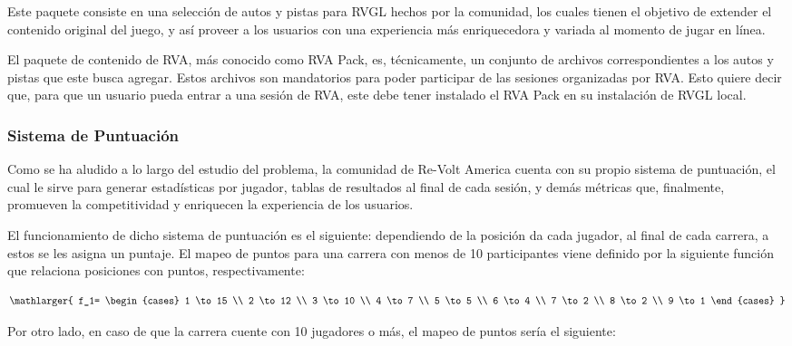 Este paquete consiste en una selección de autos y pistas para RVGL hechos por la comunidad, los cuales tienen el objetivo de extender el contenido original del juego, y así proveer a los usuarios con una experiencia más enriquecedora y variada al momento de jugar en línea.

El paquete de contenido de RVA, más conocido como RVA Pack, es, técnicamente, un conjunto de archivos correspondientes a los autos y pistas que este busca agregar. Estos archivos son mandatorios para poder participar de las sesiones organizadas por RVA. Esto quiere decir que, para que un usuario pueda entrar a una sesión de RVA, este debe tener instalado el RVA Pack en su instalación de RVGL local.

\subsubsection{Sistema de Puntuación}
Como se ha aludido a lo largo del estudio del problema, la comunidad de Re-Volt America cuenta con su propio sistema de puntuación, el cual le sirve para generar estadísticas por jugador, tablas de resultados al final de cada sesión, y demás métricas que, finalmente, promueven la competitividad y enriquecen la experiencia de los usuarios.

El funcionamiento de dicho sistema de puntuación es el siguiente: dependiendo de la posición da cada jugador, al final de cada carrera, a estos se les asigna un puntaje. El mapeo de puntos para una carrera con menos de 10 participantes viene definido por la siguiente función que relaciona posiciones con puntos, respectivamente:

\[
\mathlarger{
	f_1= 
	\begin{cases}
		1 \to 15 \\
		2 \to 12 \\
		3 \to 10 \\
		4 \to 7 \\
		5 \to 5 \\
		6 \to 4 \\
		7 \to 2 \\
		8 \to 2 \\
		9 \to 1
	\end{cases}
}
\]

Por otro lado, en caso de que la carrera cuente con 10 jugadores o más, el mapeo de puntos sería el siguiente:

